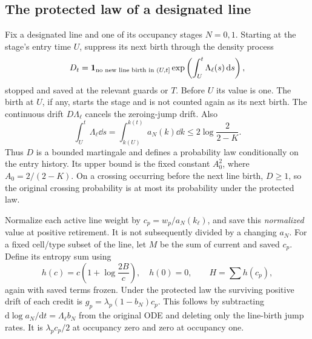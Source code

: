 \subsection{The protected law of a designated line}
Fix a designated line and one of its occupancy stages \(N=0,1\).
Starting at the stage's entry time \(U\), suppress its next birth
through the density process
\[
 D_t=\mathbf 1_{\text{no new line birth in }(U,t]}
 \exp\left(\int_U^t\Lambda_\ell(s)\,\mathrm d s\right),
\]
stopped and saved at the relevant guards or \(T\). Before \(U\) its
value is one. The birth at \(U\), if any, starts the stage and is
not counted again as its next birth. The continuous drift
\(D\Lambda_\ell\) cancels the zeroing-jump drift. Also
\[
 \int_U^t\Lambda_\ell\dd s
 =\int_{k(U)}^{k(t)}a_N(k)\dd k
 \le2\log\frac2{2-K}.
\]
Thus \(D\) is a bounded martingale and defines a probability law
conditionally on the entry history. Its upper bound is the fixed
constant \(A_0^2\), where \(A_0=2/(2-K)\). On a crossing occurring
before the next line birth, \(D\ge1\), so the original crossing
probability is at most its probability under the protected law.

Normalize each active line weight by
\(c_p=w_p/a_N(k_\ell)\), and save this \emph{normalized} value at
positive retirement. It is not subsequently divided by a changing
\(a_N\). For a fixed cell/type subset of the line, let \(M\) be the
sum of current and saved \(c_p\). Define its entropy sum using
\[
 h(c)=c\left(1+\log\frac{2B}{c}\right),\quad h(0)=0,
 \qquad H=\sum h(c_p),
\]
again with saved terms frozen. Under the protected law the surviving
positive drift of each credit is
\(g_p=\lambda_p(1-b_N)c_p\). This follows by subtracting
\(\mathrm d\log a_N/\mathrm dt=\Lambda_\ell b_N\) from the original
ODE and deleting only the line-birth jump rates. It is
\(\lambda_pc_p/2\) at occupancy zero and zero at occupancy one.

